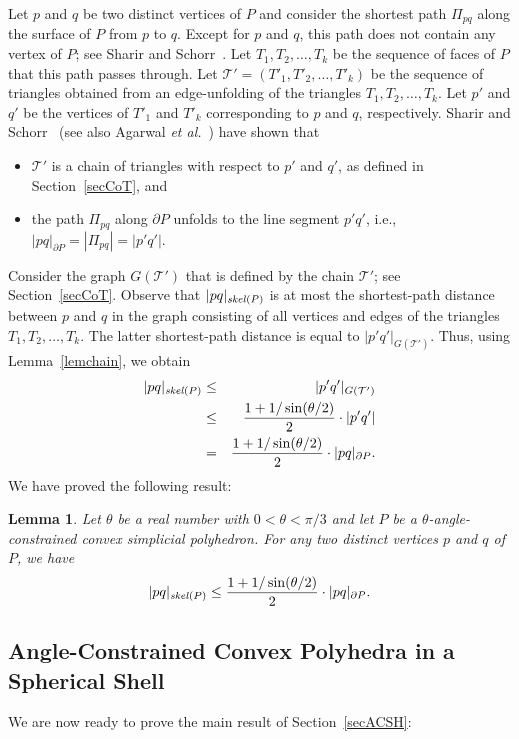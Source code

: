\documentclass[12pt]{article}
\newtheorem{lemma}{Lemma}
\newcommand{\skel}{\mathord{\it skel}}
\begin{document}
Let $p$ and $q$ be two distinct vertices of $P$ and consider the 
shortest path $\Pi_{pq}$ along the surface of $P$ from $p$ to $q$. 
Except for $p$ and $q$, this path does not contain any vertex of $P$; 
see Sharir and Schorr~\cite{ss-spps-86}. Let $T_1,T_2,\ldots,T_k$ be 
the sequence of faces of $P$ that this path passes through. Let 
$\mathcal{T'} = (T'_1,T'_2,\ldots,T'_k)$ be the sequence of triangles 
obtained from an edge-unfolding of the triangles $T_1,T_2,\ldots,T_k$. 
Let $p'$ and $q'$ be the vertices of $T'_1$ and $T'_k$ corresponding to 
$p$ and $q$, respectively. Sharir and Schorr~\cite{ss-spps-86} 
(see also Agarwal \emph{et al.}~\cite{aaos-supa-97}) have shown that 
\begin{itemize}
\item $\mathcal{T'}$ is a chain of triangles with respect to $p'$ and 
      $q'$, as defined in Section~\ref{secCoT}, and 
\item the path $\Pi_{pq}$ along $\partial P$ unfolds to the line segment 
      $p'q'$, i.e., $|pq|_{\partial P} = |\Pi_{pq}| = |p'q'|$. 
\end{itemize} 
Consider the graph $G(\mathcal{T'})$ that is defined by the chain 
$\mathcal{T'}$; see Section~\ref{secCoT}. Observe that $|pq|_{\skel(P)}$ 
is at most the shortest-path distance between $p$ and $q$ in the graph 
consisting of all vertices and edges of the triangles 
$T_1,T_2,\ldots,T_k$. The latter shortest-path distance is equal to 
$|p'q'|_{G(\mathcal{T'})}$. Thus, using Lemma~\ref{lemchain}, we obtain 
\begin{eqnarray*} 
 |pq|_{\skel(P)} & \leq & |p'q'|_{G(\mathcal{T'})} \\ 
   & \leq & 
    \frac{1+1/\sin(\theta/2)}{2} \cdot |p'q'| \\  
     & = & 
      \frac{1+1/\sin(\theta/2)}{2} \cdot |pq|_{\partial P} .  
\end{eqnarray*} 
We have proved the following result: 

\begin{lemma}  \label{lempartial} 
Let $\theta$ be a real number with $0 < \theta < \pi/3$ and let $P$ be 
a $\theta$-angle-constrained convex simplicial polyhedron. 
For any two distinct vertices $p$ and $q$ of $P$, we have 
\[ |pq|_{\skel(P)} \leq 
           \frac{1+1/\sin(\theta/2)}{2} \cdot|pq|_{\partial P} .  
\]
\end{lemma} 

\subsection{Angle-Constrained Convex Polyhedra in a Spherical Shell}   
We are now ready to prove the main result of Section~\ref{secACSH}: 
\end{document}
